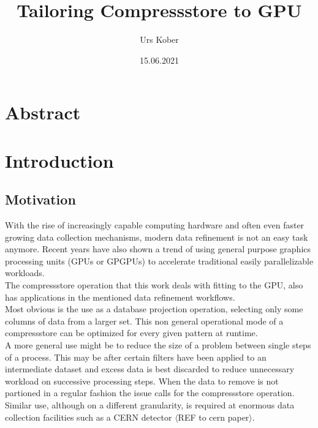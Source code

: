 \documentclass{tudscrreprt}
\newcommand{\markr}[1]{\textcolor{review}{$\langle$#1$\rangle$}}
\begin{document}
	
	\date{15.06.2021}
	\title{Tailoring Compressstore to GPU}
	 
	\author{ Urs Kober
		\matriculationnumber{---}
		\placeofbirth{---}
	}
	\maketitle
	
	\chapter*{Abstract}
	
	\tableofcontents
	
	\chapter{Introduction}
		
		\section{Motivation}
			With the rise of increasingly capable computing hardware and often even faster growing data collection mechanisms, modern data refinement is not an easy task anymore. Recent years have also shown a trend of using general purpose graphics processing units (GPUs or GPGPUs) to accelerate traditional easily parallelizable workloads. \\
			
			The compressstore operation that this work deals with fitting to the GPU, also has applications in the mentioned data refinement workflows. \\
			Most obvious is the use as a database projection operation, selecting only some columns of data from a larger set. This non general operational mode of a compressstore can be optimized for every given pattern at runtime. \\
			A more general use might be to reduce the size of a problem between single steps of a process. This may be after certain filters have been applied to an intermediate dataset and excess data is best discarded to reduce unnecessary workload on successive processing steps. When the data to remove is not partioned in a regular fashion the issue calls for the compressstore operation. \\
			Similar use, although on a different granularity, is required at enormous data collection facilities such as a CERN detector \markr{REF to cern paper}. \\
			
\end{document}
